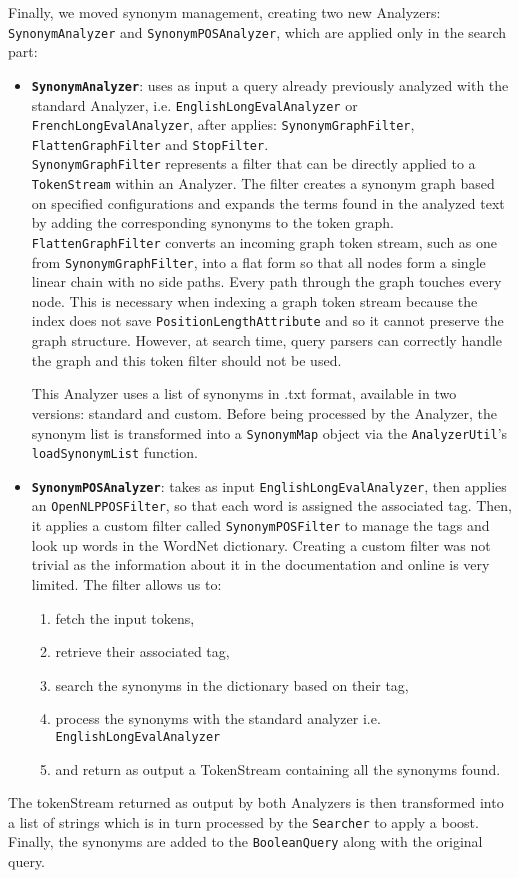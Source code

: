 Finally, we moved synonym management, creating two new Analyzers: \texttt{SynonymAnalyzer} and \texttt{SynonymPOSAnalyzer}, which are applied only in the search part:
\begin{itemize}
	\item \textbf{\texttt{SynonymAnalyzer}}: uses as input a query already previously analyzed with the standard Analyzer, i.e. \texttt{EnglishLongEvalAnalyzer} or \texttt{FrenchLongEvalAnalyzer}, after applies: \texttt{SynonymGraphFilter}, \texttt{FlattenGraphFilter} and \texttt{StopFilter}.\\ 
\texttt{SynonymGraphFilter} represents a filter that can be directly applied to a \texttt{TokenStream} within an Analyzer. The filter creates a synonym graph based on specified configurations and expands the terms found in the analyzed text by adding the corresponding synonyms to the token graph. \texttt{FlattenGraphFilter} converts an incoming graph token stream, such as one from \texttt{SynonymGraphFilter}, into a flat form so that all nodes form a single linear chain with no side paths. Every path through the graph touches every node. This is necessary when indexing a graph token stream because the index does not save \texttt{PositionLengthAttribute} and so it cannot preserve the graph structure. However, at search time, query parsers can correctly handle the graph and this token filter should not be used.

This Analyzer uses a list of synonyms in .txt format, available in two versions: standard and custom. Before being processed by the Analyzer, the synonym list is transformed into a \texttt{SynonymMap} object via the \texttt{AnalyzerUtil}'s \texttt{loadSynonymList} function.

	\item \textbf{\texttt{SynonymPOSAnalyzer}}: takes as input \texttt{EnglishLongEvalAnalyzer}, then applies an \texttt{OpenNLPPOSFilter}, so that each word is assigned the associated tag.
Then, it applies a custom filter called \texttt{SynonymPOSFilter} to manage the tags and look up words in the WordNet dictionary. Creating a custom filter was not trivial as the information about it in the documentation and online is very limited. 
The filter allows us to:
	\begin{enumerate}
		\item fetch the input tokens, 
		\item retrieve their associated tag, 
		\item search the synonyms in the dictionary based on their tag,
		\item process the synonyms with the standard analyzer i.e. \texttt{EnglishLongEvalAnalyzer}
		\item and return as output a TokenStream containing all the synonyms found. 
	\end{enumerate}
\end{itemize}
The tokenStream returned as output by both Analyzers is then transformed into a list of strings which is in turn processed by the \texttt{Searcher} to apply a boost. Finally, the synonyms are added to the \texttt{BooleanQuery} along with the original query.